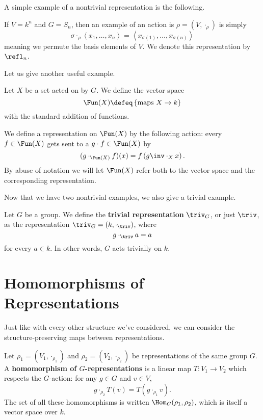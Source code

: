 A simple example of a nontrivial representation is the following.
\begin{example}
	If $V = k^{n}$ and $G = S_n$,
	then an example of an action is $\rho = (V, \cdot_\rho)$
	is simply \[ \sigma \cdot_\rho \left<x_1, \dots, x_n\right> =
	\left<x_{\sigma(1)}, \dots, x_{\sigma(n)}\right> \]
	meaning we permute the basis elements of $V$.
	We denote this representation by $\refl_n$.
\end{example}
Let us give another useful example.
\begin{definition}
	Let $X$ be a set acted on by $G$.
	We define the vector space
	\[ \Fun(X) \defeq \left\{ \text{maps } X \to k \right\} \]
	with the standard addition of functions.
\end{definition}
\begin{example}
	We define a representation on $\Fun(X)$ by the following action: every $f \in \Fun(X)$ gets sent to a $g \cdot f \in \Fun(X)$ by
	\[ (g \cdot_{\Fun(X)} f)(x) = f\left( g\inv \cdot_X x \right). \]
	By abuse of notation we will let $\Fun(X)$ refer both to the vector space and the corresponding representation.
\end{example}
Now that we have two nontrivial examples, we also give a trivial example.
\begin{example}
	Let $G$ be a group.
	We define the \textbf{trivial representation} $\triv_G$, or just $\triv$, as the representation $\triv_G = (k, \cdot_\triv)$, where
	\[ g \cdot_\triv a = a \]
	for every $a \in k$.
	In other words, $G$ acts trivially on $k$.
\end{example}

\section{Homomorphisms of Representations}
Just like with every other structure we've considered, we
can consider the structure-preserving maps between representations.

\begin{definition}
	Let $\rho_1 = (V_1, \cdot_{\rho_1})$ and $\rho_2 = (V_2, \cdot_{\rho_2})$ be representations of the same group $G$.
	A \textbf{homomorphism of $G$-representations} is a linear map $T : V_1 \to V_2$ which respects the $G$-action: for any $g \in G$ and $v \in V$,
	\[ g \cdot_{\rho_2} T(v) = T\left( g \cdot_{\rho_1} v \right). \]
	The set of all these homomorphisms is written $\Hom_G(\rho_1, \rho_2)$,
	which is itself a vector space over $k$.
\end{definition}

